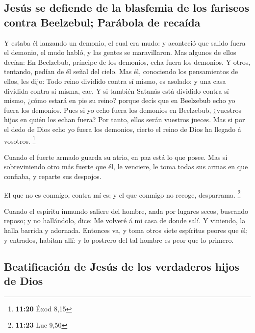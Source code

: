 \hypertarget{jesuxfas-se-defiende-de-la-blasfemia-de-los-fariseos-contra-beelzebul-paruxe1bola-de-recauxedda}{%
\subsection{Jesús se defiende de la blasfemia de los fariseos contra
Beelzebul; Parábola de
recaída}\label{jesuxfas-se-defiende-de-la-blasfemia-de-los-fariseos-contra-beelzebul-paruxe1bola-de-recauxedda}}

 Y estaba él lanzando un demonio, el cual era mudo: y
aconteció que salido fuera el demonio, el mudo habló, y las gentes se
maravillaron.  Mas algunos de ellos decían: En Beelzebub,
príncipe de los demonios, echa fuera los demonios.  Y
otros, tentando, pedían de él señal del cielo.  Mas él,
conociendo los pensamientos de ellos, les dijo: Todo reino dividido
contra sí mismo, es asolado; y una casa dividida contra sí misma, cae.
 Y si también Satanás está dividido contra sí mismo, ¿cómo
estará en pie su reino? porque decís que en Beelzebub echo yo fuera los
demonios.  Pues si yo echo fuera los demonios en Beelzebub,
¿vuestros hijos en quién los echan fuera? Por tanto, ellos serán
vuestros jueces.  Mas si por el dedo de Dios echo yo fuera
los demonios, cierto el reino de Dios ha llegado á vosotros. \footnote{\textbf{11:20}
  Éxod 8,15}

 Cuando el fuerte armado guarda su atrio, en paz está lo
que posee.  Mas si sobreviniendo otro más fuerte que él, le
venciere, le toma todas sus armas en que confiaba, y reparte sus
despojos.

 El que no es conmigo, contra mí es; y el que conmigo no
recoge, desparrama. \footnote{\textbf{11:23} Luc 9,50}

 Cuando el espíritu inmundo saliere del hombre, anda por
lugares secos, buscando reposo; y no hallándolo, dice: Me volveré á mi
casa de donde salí.  Y viniendo, la halla barrida y
adornada.  Entonces va, y toma otros siete espíritus peores
que él; y entrados, habitan allí: y lo postrero del tal hombre es peor
que lo primero.

\hypertarget{beatificaciuxf3n-de-jesuxfas-de-los-verdaderos-hijos-de-dios}{%
\subsection{Beatificación de Jesús de los verdaderos hijos de
Dios}\label{beatificaciuxf3n-de-jesuxfas-de-los-verdaderos-hijos-de-dios}}

